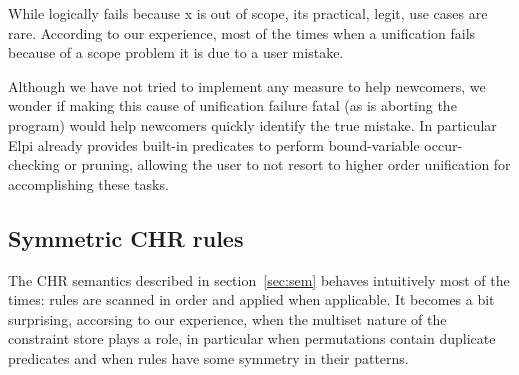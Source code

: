 \documentclass[a4paper, 11pt]{book}
\begin{document}
While  logically fails because x is
out of scope, its practical, legit, use cases are rare.
According to our experience, most of the times when a
unification fails because of
a scope problem it is due to a user mistake.

Although we have not tried to implement any measure to help
newcomers, we wonder if making this cause of unification failure
fatal (as is aborting the program) would help newcomers quickly
identify the true mistake. In particular Elpi already provides
built-in predicates to perform bound-variable occur-checking
or pruning, allowing the user to not resort to higher order
unification for accomplishing these tasks.

\subsection{Symmetric CHR rules}

The CHR semantics described in section~\ref{sec:sem} behaves intuitively most of
the times: rules
are scanned in order and applied when applicable. It becomes a bit surprising,
accorsing to our experience, when the multiset nature of the constraint store
plays a role, in particular when permutations contain duplicate predicates
and when rules have some symmetry in their patterns.
\end{document}

